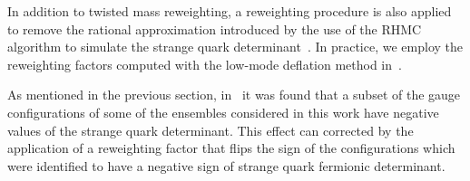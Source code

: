 In addition to twisted mass reweighting, a reweighting procedure is also applied to remove the rational approximation introduced by the use of the RHMC algorithm to simulate the strange quark determinant~\citep{Kennedy:1998cu,Clark:2006fx}. In practice, we employ the reweighting factors computed with the low-mode deflation method in~\citep{Kuberski:2023zky}.

As mentioned in the previous section, in~\citep{Mohler:2020txx} it was found that a subset of the gauge configurations of some of the ensembles considered in this work have negative values of the strange quark determinant. This effect can corrected by the application of a reweighting factor that flips the sign of the configurations which were identified to have a negative sign of strange quark fermionic determinant. 


